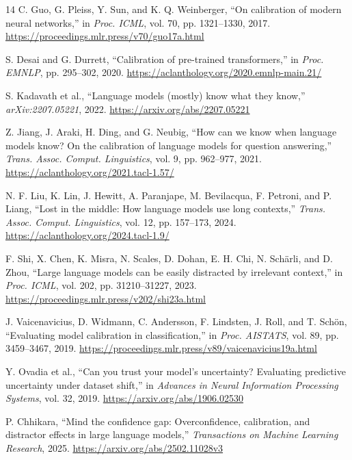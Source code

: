 \documentclass[conference]{IEEEtran}
\begin{document}
\begin{thebibliography}{14}
C. Guo, G. Pleiss, Y. Sun, and K. Q. Weinberger,
``On calibration of modern neural networks,'' in \emph{Proc. ICML},
vol. 70, pp. 1321--1330, 2017.
\url{https://proceedings.mlr.press/v70/guo17a.html}

S. Desai and G. Durrett, ``Calibration of pre-trained transformers,''
in \emph{Proc. EMNLP}, pp. 295--302, 2020.
\url{https://aclanthology.org/2020.emnlp-main.21/}

S. Kadavath et al., ``Language models (mostly) know what they know,''
\emph{arXiv:2207.05221}, 2022.
\url{https://arxiv.org/abs/2207.05221}

Z. Jiang, J. Araki, H. Ding, and G. Neubig,
``How can we know when language models know? On the calibration of language models for question answering,''
\emph{Trans. Assoc. Comput. Linguistics}, vol. 9, pp. 962--977, 2021.
\url{https://aclanthology.org/2021.tacl-1.57/}

N. F. Liu, K. Lin, J. Hewitt, A. Paranjape, M. Bevilacqua, F. Petroni,
and P. Liang, ``Lost in the middle: How language models use long contexts,''
\emph{Trans. Assoc. Comput. Linguistics}, vol. 12, pp. 157--173, 2024.
\url{https://aclanthology.org/2024.tacl-1.9/}

F. Shi, X. Chen, K. Misra, N. Scales, D. Dohan, E. H. Chi,
N. Sch\"arli, and D. Zhou,
``Large language models can be easily distracted by irrelevant context,''
in \emph{Proc. ICML}, vol. 202, pp. 31210--31227, 2023.
\url{https://proceedings.mlr.press/v202/shi23a.html}

J. Vaicenavicius, D. Widmann, C. Andersson, F. Lindsten, J. Roll,
and T. Sch\"on, ``Evaluating model calibration in classification,''
in \emph{Proc. AISTATS}, vol. 89, pp. 3459--3467, 2019.
\url{https://proceedings.mlr.press/v89/vaicenavicius19a.html}

Y. Ovadia et al., ``Can you trust your model's uncertainty?
Evaluating predictive uncertainty under dataset shift,''
in \emph{Advances in Neural Information Processing Systems}, vol. 32, 2019.
\url{https://arxiv.org/abs/1906.02530}

P. Chhikara, ``Mind the confidence gap: Overconfidence, calibration,
and distractor effects in large language models,''
\emph{Transactions on Machine Learning Research}, 2025.
\url{https://arxiv.org/abs/2502.11028v3}


\end{thebibliography}
\end{document}
